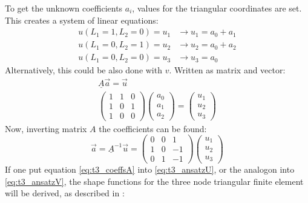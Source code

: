   To get the unknown coefficients $a_i$, values for the triangular coordinates are set. This creates a system of linear equations:
  \begin{align}
  u(L_1=1, L_2=0) = u_1 &\rightarrow u_1 = a_0 + a_1 \nonumber\\
  u(L_1=0, L_2=1) = u_2 &\rightarrow u_2 = a_0 + a_2 \nonumber\\
  u(L_1=0, L_2=0) = u_3 &\rightarrow u_3 = a_0
  \end{align}
  Alternatively, this could be also done with $v$. Written as matrix and vector:
  \begin{align}
  \underline{A} \vec{a} = \vec{u} \nonumber\\
  \begin{pmatrix}
  1 & 1 & 0\\
  1 & 0 & 1\\
  1 & 0 & 0
  \end{pmatrix} \begin{pmatrix}
  a_0 \\ a_1 \\ a_2
  \end{pmatrix} = \begin{pmatrix}
  u_1 \\ u_2 \\ u_3
  \end{pmatrix}
  \end{align}
  Now, inverting matrix $A$ the coefficients can be found:
  \begin{equation}\label{eq:t3_coeffsA}
  \vec{a} = \underline{A}^{-1} \vec{u} = \begin{pmatrix}
  0 & 0 & 1\\
  1 & 0 & -1\\
  0 & 1 & -1
  \end{pmatrix} \begin{pmatrix}
  u_1 \\ u_2 \\ u_3
  \end{pmatrix}
  \end{equation}
  If one put equation \ref{eq:t3_coeffsA} into \ref{eq:t3_ansatzU}, or the analogon into \ref{eq:t3_ansatzV}, the shape functions for the three node triangular finite element will be derived, as described in \cite{steinke2005finite}:
